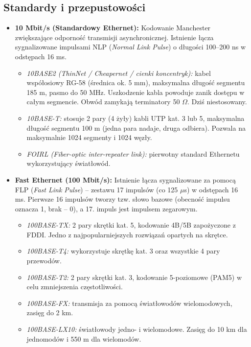 \documentclass[11pt,a4paper]{article}
\begin{document}
\subsection{Standardy i przepustowości}
\begin{itemize}[noitemsep]
    \item \textbf{10 Mbit/s (Standardowy Ethernet):} Kodowanie Manchester zwiększające odporność transmisji asynchronicznej. Istnienie łącza sygnalizowane impulsami NLP (\textit{Normal Link Pulse}) o długości 100--200 ns w odstępach 16 ms.
    \begin{itemize}[noitemsep]
        \item \textit{10BASE2 (ThinNet / Cheapernet / cienki koncentryk):} kabel współosiowy RG-58 (średnica ok. 5 mm), maksymalna długość segmentu 185 m, pasmo do 50 MHz. Uszkodzenie kabla powoduje zanik dostępu w całym segmencie. Obwód zamykają terminatory 50 $\Omega$. Dziś niestosowany.
        \item \textit{10BASE-T:} stosuje 2 pary (4 żyły) kabli UTP kat. 3 lub 5, maksymalna długość segmentu 100 m (jedna para nadaje, druga odbiera). Pozwala na maksymalnie 1024 segmenty i 1024 węzły.
        \item \textit{FOIRL (\textit{Fiber-optic inter-repeater link}):} pierwotny standard Ethernetu wykorzystujący światłowód.
    \end{itemize}
    \item \textbf{Fast Ethernet (100 Mbit/s):} Istnienie łącza sygnalizowane za pomocą FLP (\textit{Fast Link Pulse}) -- zestawu 17 impulsów (co 125 $\mu$s) w odstępach 16 ms. Pierwsze 16 impulsów tworzy tzw. słowo bazowe (obecność impulsu oznacza 1, brak -- 0), a 17. impuls jest impulsem zegarowym.
    \begin{itemize}[noitemsep]
        \item \textit{100BASE-TX:} 2 pary skrętki kat. 5, kodowanie 4B/5B zapożyczone z FDDI. Jedno z najpopularniejszych rozwiązań opartych na skrętce.
        \item \textit{100BASE-T4:} wykorzystuje skrętkę kat. 3 oraz wszystkie 4 pary przewodów.
        \item \textit{100BASE-T2:} 2 pary skrętki kat. 3, kodowanie 5-poziomowe (PAM5) w celu zmniejszenia częstotliwości.
        \item \textit{100BASE-FX:} transmisja za pomocą światłowodów wielomodowych, zasięg do 2 km.
        \item \textit{100BASE-LX10:} światłowody jedno- i wielomodowe. Zasięg do 10 km dla jednomodów i 550 m dla wielomodów.

\end{itemize}
\end{itemize}
\end{document}
